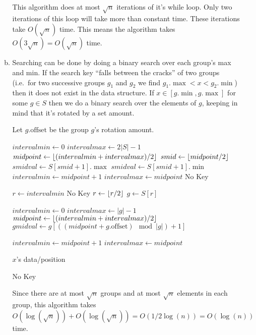 \documentclass[letterpaper,10pt]{article}
\DeclarePairedDelimiter{\floor}{\lfloor}{\rfloor}
\begin{document}
\begin{enumerate}
\begin{enumerate}[a)]
		This algorithm does at most $\sqrt{n}$ iterations of it's while loop. Only two iterations of this loop will take more than constant time. These iterations take $O(\sqrt{n})$ time. This means the algorithm takes $O(3 \sqrt{n}) = O(\sqrt{n})$ time.

		\item Searching can be done by doing a binary search over each group's max and min. If the search key ``falls between the cracks'' of two groups (i.e.\ for two successive groups $g_1$ and $g_2$ we find $g_1.\max < x < g_2.\min$) then it does not exist in the data structure. If $x \in [g.\min, g.\max]$ for some $g \in S$ then we do a binary search over the elements of $g$, keeping in mind that it's rotated by a set amount.

		Let $g.\text{offset}$ be the group $g$'s rotation amount.
		\begin{algorithmic}
			\State $intervalmin \gets 0$
			\State $intervalmax \gets 2|S|-1$
				\State $midpoint \gets \floor{(intervalmin + intervalmax)/2}$
				\State $smid \gets \floor{midpoint/2}$
				\State $smidval \gets S[smid+1].\max $
					\State $smidval \gets S[smid+1].\min $
				\EndIf
					\State $intervalmin \gets midpoint+1$
				\Else
					\State $intervalmax \gets midpoint$
				\EndIf
			\EndWhile
				\State \Return No Key
			\EndIf

			\State $r \gets intervalmin$
				\State \Return No Key
			\EndIf
			\State $r \gets \floor{r/2}$
			\State $g \gets S[r]$


			\State $intervalmin \gets 0$
			\State $intervalmax \gets |g|-1$
				\State $midpoint \gets \floor{(intervalmin + intervalmax)/2}$
				\State $gmidval \gets g[((midpoint+g.\text{offset}) \mod |g|) + 1] $

					\State $intervalmin \gets midpoint+1$
				\Else
					\State $intervalmax \gets midpoint$
				\EndIf
			\EndWhile

				\Return $x$'s data/position
			\EndIf

			\State \Return No Key
		\EndFunction
		\end{algorithmic}

		Since there are at most $\sqrt{n}$ groups and at most $\sqrt{n}$ elements in each group, this algorithm takes $O(\log(\sqrt{n}))+O(\log(\sqrt{n})) = O(1/2 \log(n)) = O(\log(n))$ time.


\end{enumerate}
\end{enumerate}
\end{document}
